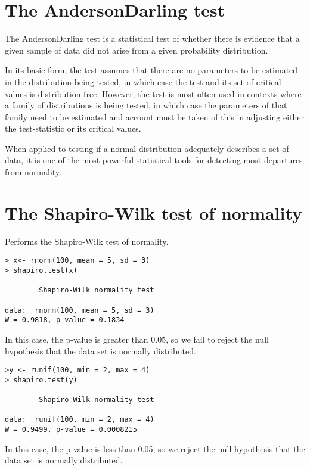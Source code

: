 \documentclass[a4paper,12pt]{article}
\begin{document}
\section{The AndersonDarling test}

The AndersonDarling test is a statistical test of whether there is evidence that a given sample of data did not arise from a given probability distribution.

In its basic form, the test assumes that there are no parameters to be estimated in the distribution being tested, in which case the test and its set of critical values is distribution-free. However, the test is most often used in contexts where a family of distributions is being tested, in which case the parameters of that family need to be estimated and account must be taken of this in adjusting either the test-statistic or its critical values.

When applied to testing if a normal distribution adequately describes a set of data, it is one of the most powerful statistical tools for detecting most departures from normality.

\section{The Shapiro-Wilk test of normality}
Performs the Shapiro-Wilk test of normality.
\begin{verbatim}
> x<- rnorm(100, mean = 5, sd = 3)
> shapiro.test(x)

        Shapiro-Wilk normality test

data:  rnorm(100, mean = 5, sd = 3)
W = 0.9818, p-value = 0.1834
\end{verbatim}
In this case, the p-value is greater than 0.05, so we fail to reject the null hypothesis that the
data set is normally distributed.
\begin{verbatim}
>y <- runif(100, min = 2, max = 4)
> shapiro.test(y)

        Shapiro-Wilk normality test

data:  runif(100, min = 2, max = 4)
W = 0.9499, p-value = 0.0008215
\end{verbatim}
In this case, the p-value is less than 0.05, so we reject the null hypothesis that the
data set is normally distributed.
\end{document}
